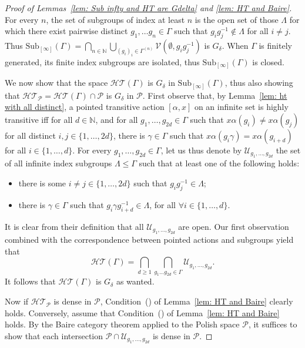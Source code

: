 \documentclass[12pt]{article}
\numberwithin{equation}{section}
\theoremstyle{definition}
\newcommand{\N}{\mathbb{N}}
\newcommand{\inv}{^{-1}}
\newcommand{\Sub}{\mathrm{Sub}}
\begin{document}
\begin{proof}[Proof of Lemmas~\ref{lem: Sub infty and HT are Gdelta} and \ref{lem: HT and Baire}]
For every $n$, the set of subgroups of index at least $n$
is the open set of those $\Lambda$ for which there exist pairwise distinct $g_1, \ldots g_n \in \Gamma$
such that $g_i g_j\inv \notin \Lambda$ for all $i\neq j$. Thus 
\(\Sub_{[\infty]}(\Gamma)=\bigcap_{n\in \N}\bigcup_{(g_i)_i\in \Gamma^{(n)}}
\mathcal V(\emptyset, g_i g_j\inv )\) is \( G_\delta \).
When $\Gamma$ is finitely generated, its finite index subgroups are isolated, thus $\Sub_{[\infty]}(\Gamma)$ is closed.


	We now show that the space \(\mathcal{HT}(\Gamma)\) is \( G_\delta \) 
	in \(\Sub_{[\infty]}(\Gamma)\), thus also showing that \(\mathcal{HT}_{\mathcal P}=\mathcal{HT}(\Gamma)\cap \mathcal P\)
	is \( G_\delta \) in \(\mathcal P\). 
	First observe that, by Lemma~\ref{lem: ht with all distinct}, a pointed transitive action \( [\alpha,x] \) on an infinite set is highly transitive
	iff for all \( d\in\N \), and for all \( g_1,\dots,g_{2d}\in\Gamma \) such that 
	\( x\alpha(g_i)\neq x\alpha(g_j) \) for all distinct \( i,j\in \{1,\dots,2d\} \), 
	there is \( \gamma\in\Gamma \) such that
	\( x\alpha(g_i\gamma)=x\alpha(g_{i+d})\) for all \( i\in \{1,\dots,d\}\).
	For every \( g_1,\dots,g_{2d}\in\Gamma \), let us thus denote by \( \mathcal U_{g_1,\dots,g_{2d}} \) the set of 
	all infinite index subgroups \( \Lambda\leq \Gamma \) such that at least one of the following holds:
	\begin{itemize}
		\item there is some \( i\neq j\in \{1,\dots,2d\} \) such that 
			  \( g_i g_j\inv\in\Lambda \);
		\item there is \( \gamma\in\Gamma \) such that 
		\(g_i\gamma g_{i+d}\inv\in\Lambda\), for all \(\forall i\in \{1,\dots,d\}\).
	\end{itemize}
	It is clear from their definition that all \( \mathcal U_{g_1,\dots,g_{2d}} \) are open. Our first observation combined with the correspondence between pointed actions 
	and subgroups yield that
	\[
	\mathcal{HT}(\Gamma)=\bigcap_{d\geq 1}\bigcap_{g_1\dots g_{2d}\in \Gamma} \mathcal U_{g_1,\dots,g_{2d}}.
	\]
	It follows that \(\mathcal{HT}(\Gamma)\) is \( G_\delta \) as wanted.

	Now if \(\mathcal{HT}_{\mathcal P}\) is dense in \(\mathcal P\),  Condition~(\textasteriskcentered) of Lemma~\ref{lem: HT and Baire}
	clearly holds. Conversely, assume that  Condition~(\textasteriskcentered) of Lemma~\ref{lem: HT and Baire} holds. 
	By the Baire category theorem applied to the Polish space \(\mathcal P\),
	it suffices to show that
	each intersection \(\mathcal P \cap\mathcal U_{g_1,\dots,g_{2d}}\) is dense in \(\mathcal P\). 
	


\end{proof}
\end{document}
